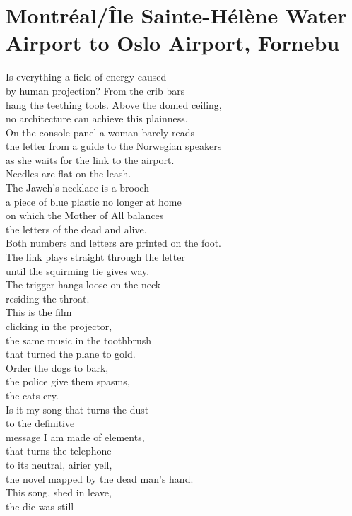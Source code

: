 \documentclass[smalldemyvopaper,11pt,twoside,onecolumn,openright,extrafontsizes]{memoir}
\begin{document}
\chapter{Montréal/Île Sainte-Hélène Water Airport to Oslo Airport, Fornebu}
Is everything a field of energy caused
\\by human projection? From the crib bars
\\hang the teething tools. Above the domed ceiling,
\\no architecture can achieve this plainness.
\\On the console panel a woman barely reads
\\the letter from a guide to the Norwegian speakers
\\as she waits for the link to the airport.
\\Needles are flat on the leash.
\\The Jaweh's necklace is a brooch
\\a piece of blue plastic no longer at home
\\on which the Mother of All balances
\\the letters of the dead and alive.
\\Both numbers and letters are printed on the foot.
\\The link plays straight through the letter
\\until the squirming tie gives way.
\\The trigger hangs loose on the neck
\\residing the throat.
\\This is the film
\\clicking in the projector,
\\the same music in the toothbrush
\\that turned the plane to gold.
\\Order the dogs to bark,
\\the police give them spasms,
\\the cats cry.
\\Is it my song that turns the dust
\\to the definitive
\\message I am made of elements,
\\that turns the telephone
\\to its neutral, airier yell,
\\the novel mapped by the dead man's hand.
\\This song, shed in leave,
\\the die was still
\end{document}
